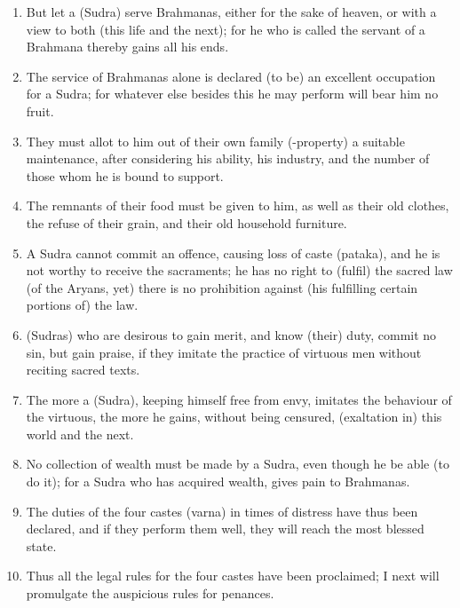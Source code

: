 \begin{enumerate}
\item But let a (Sudra) serve Brahmanas, either for the sake of heaven, or with a view to both (this life and the next); for he who is called the servant of a Brahmana thereby gains all his ends.
\item The service of Brahmanas alone is declared (to be) an excellent occupation for a Sudra; for whatever else besides this he may perform will bear him no fruit.
\item They must allot to him out of their own family (-property) a suitable maintenance, after considering his ability, his industry, and the number of those whom he is bound to support.
\item The remnants of their food must be given to him, as well as their old clothes, the refuse of their grain, and their old household furniture.
\item A Sudra cannot commit an offence, causing loss of caste (pataka), and he is not worthy to receive the sacraments; he has no right to (fulfil) the sacred law (of the Aryans, yet) there is no prohibition against (his fulfilling certain portions of) the law.
\item (Sudras) who are desirous to gain merit, and know (their) duty, commit no sin, but gain praise, if they imitate the practice of virtuous men without reciting sacred texts.
\item The more a (Sudra), keeping himself free from envy, imitates the behaviour of the virtuous, the more he gains, without being censured, (exaltation in) this world and the next.
\item No collection of wealth must be made by a Sudra, even though he be able (to do it); for a Sudra who has acquired wealth, gives pain to Brahmanas.
\item The duties of the four castes (varna) in times of distress have thus been declared, and if they perform them well, they will reach the most blessed state.
\item Thus all the legal rules for the four castes have been proclaimed; I next will promulgate the auspicious rules for penances.
\end{enumerate}

